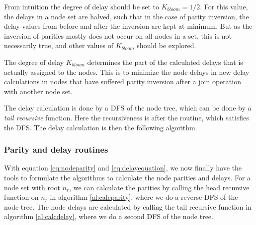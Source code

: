 From intuition the degree of delay should be set to $K_{bloom} = 1/2$. For this value, the delays in a node set are halved, such that in the case of parity inversion, the delay values from before and after the inversion are kept at minimum. But as the inversion of parities mostly does not occur on all nodes in a set, this is not necessarily true, and other values of $K_{bloom}$ should be explored.

\begin{lemma}
  The degree of delay $K_{bloom}$ determines the part of the calculated delays that is actually assigned to the nodes. This is to minimize the node delays in new delay calculations in nodes that have suffered parity inversion after a join operation with another node set.
\end{lemma}

The delay calculation is done by a DFS of the node tree, which can be done by a \emph{tail recursive} function. Here the recursiveness is after the routine, which satisfies the DFS. The delay calculation is then the following algorithm.

\begin{algo}[algotitle=CalcDelay, label=al:calcdelay]
\begin{algorithm}[H]

\KwData{\node, \cluster}

\BlankLine

\end{algorithm}
\end{algo}


\subsubsection{Parity and delay routines}

With equation \ref{eq:nodeparity} and \ref{eq:delayequation}, we now finally have the tools to formulate the algorithms to calculate the node parities and delays. For a node set with root $n_r$, we can calculate the parities by calling the head recursive function  on $n_r$ in algorithm \ref{al:calcparity}, where we do a reverse DFS of the node tree. The node delays are calculated by calling the tail recursive function  in algorithm \ref{al:calcdelay}, where we do a second DFS of the node tree.

